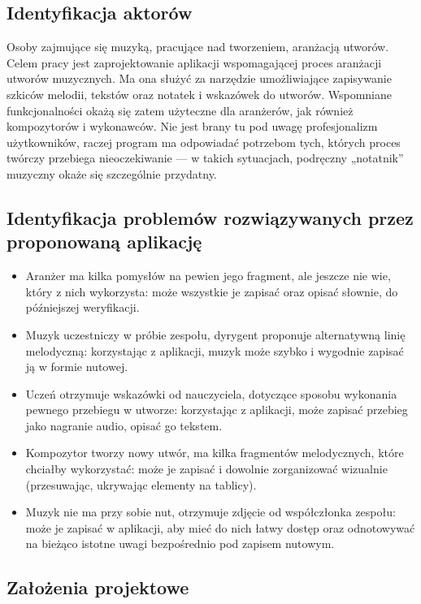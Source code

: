 \documentclass[12pt]{article}
\begin{document}
\subsection{Identyfikacja aktorów}
Osoby zajmujące się muzyką, pracujące nad tworzeniem, aranżacją utworów.
Celem pracy jest zaprojektowanie aplikacji wspomagającej proces aranżacji utworów muzycznych.
Ma ona służyć za narzędzie umożliwiające zapisywanie szkiców melodii, tekstów oraz notatek i wskazówek do utworów.
Wspomniane funkcjonalności okażą się zatem użyteczne dla aranżerów, jak również kompozytorów i wykonawców.
Nie jest brany tu pod uwagę profesjonalizm użytkowników, raczej program ma odpowiadać potrzebom tych,
których proces twórczy przebiega nieoczekiwanie — w takich sytuacjach, podręczny „notatnik” muzyczny okaże się szczególnie przydatny.

\subsection{Identyfikacja problemów rozwiązywanych przez proponowaną aplikację}
\begin{itemize}
	\item Aranżer  ma kilka pomysłów na pewien jego fragment, ale jeszcze nie wie, który z nich wykorzysta:
	      może wszystkie je zapisać oraz opisać słownie, do późniejszej weryfikacji.
	\item Muzyk uczestniczy w próbie zespołu, dyrygent proponuje alternatywną linię melodyczną:
	      korzystając z aplikacji, muzyk może szybko i wygodnie zapisać ją w formie nutowej.
	\item Uczeń otrzymuje wskazówki od nauczyciela, dotyczące sposobu wykonania pewnego przebiegu w utworze:
	      korzystając z aplikacji, może zapisać przebieg jako nagranie audio, opisać go tekstem.
	\item Kompozytor tworzy nowy utwór, ma kilka fragmentów melodycznych, które chciałby wykorzystać:
	      może je zapisać i dowolnie zorganizować wizualnie (przesuwając, ukrywając elementy na tablicy).
	\item Muzyk nie ma przy sobie nut, otrzymuje zdjęcie od współczłonka zespołu:
	      może je zapisać w aplikacji, aby mieć do nich łatwy dostęp oraz odnotowywać na bieżąco istotne uwagi bezpośrednio
	      pod zapisem nutowym.
\end{itemize}
\subsection{Założenia projektowe}
\end{document}

